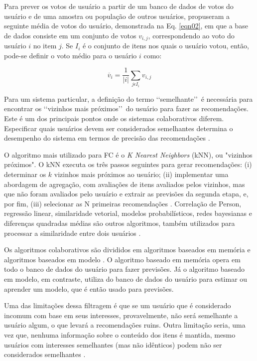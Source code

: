 Para prever os votos de usuário a partir de um banco de dados de votos do usuário e de uma amostra ou população de outros usuários, 
 propuseram a seguinte média de votos do usuário, demonstrada na  Eq. \ref{eqn02}, em que a base de dados 
consiste em um conjunto de votos $v_{i,j}$, correspondendo ao voto do usuário $i$ no item $j$. Se $I_{i}$ é o
conjunto de itens nos quais o usuário votou, então, pode-se definir o voto médio para o usuário $i$ como:

\begin{equation}
	\label{eqn02}
\overline{v}_{i} = \frac{1}{\left | i \right |} \sum_{j\epsilon I_{i}}^{} v_{i,j}
\end{equation}


Para um sistema particular, a definição do termo \lq\lq semelhante\rq\rq\ é necessária para encontrar 
os \lq\lq vizinhos mais próximos\rq\rq\ do usuário para fazer as recomendações. Este é um dos principais 
pontos onde os sistemas colaborativos diferem. Especificar quais usuários devem ser considerados semelhantes determina o
desempenho do sistema em termos de precisão das recomendações \cite{son2017}.

O algoritmo mais utilizado para FC é o \emph{K Nearest Neighbors} (kNN), ou "vizinhos próximos". O kNN executa 
os três passos seguintes para gerar recomendações: (i) determinar os $k$ vizinhos mais próximos ao usuário; (ii) implementar 
uma abordagem de agregação, com avaliações de itens avaliados pelos vizinhos, mas que não foram avaliados pelo usuário e 
extrair as previsões da segunda etapa, e, por fim, (iii) selecionar as N primeiras recomendações \cite{bobadilla2013}. Correlação de Person, regressão linear, 
similaridade vetorial, modelos probabilísticos, redes bayesianas e diferenças quadradas médias são outros algoritmos, também utilizados para processar a similaridade entre dois usuários \cite{paulson2003}.

Os algoritmos colaborativos são divididos em algoritmos baseados em memória e algoritmos baseados em 
modelo \cite{breese2013}. O algoritmo baseado em memória opera em todo o banco de dados do usuário para fazer 
previsões. Já o algoritmo baseado em modelo, em contraste, utiliza do banco de dados do usuário 
para estimar ou aprender um modelo, que é então usado para previsões.

Uma das limitações dessa filtragem é que se um usuário que é considerado incomum com base em seus 
interesses, provavelmente, não será semelhante a usuário algum,
o que levará a recomendações ruins. Outra limitação seria, uma vez que, nenhuma informação sobre o 
conteúdo dos itens é mantida, mesmo usuários com interesses semelhantes (mas não 
idênticos) podem não ser considerados semelhantes \cite{son2017}.

